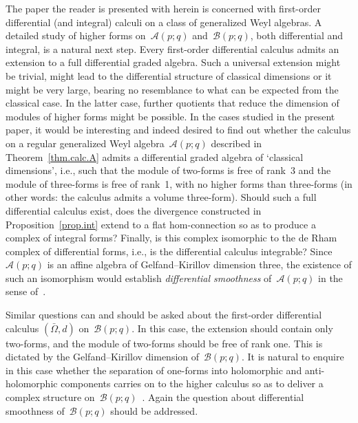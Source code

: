 \documentclass[10pt,a4paper]{amsart}
\numberwithin{equation}{section}
\def\Weyl#1#2{{\mathcal{B}}(#1;#2)}
\def\AWeyl#1#2{{\mathcal{A}}(#1;#2)}
\begin{document}
The paper the reader is presented with herein is concerned with f\/irst-order dif\/ferential (and integral) calculi on a class of generalized Weyl algebras. A detailed study of higher forms on~$\AWeyl p q$ and~$\Weyl p q$, both dif\/ferential and integral, is a natural next step. Every f\/irst-order dif\/ferential calculus admits an extension to a full dif\/ferential graded algebra. Such a universal extension might be trivial, might lead to the dif\/ferential structure of classical dimensions or it might be very large, bearing no resemblance to what can be expected from the classical case. In the latter case, further quotients that reduce the dimension of modules of higher forms might be possible. In the cases studied in the present paper, it would be interesting and indeed desired to f\/ind out whether the calculus on a regular generalized Weyl algebra~$\AWeyl p q$ described in Theorem~\ref{thm.calc.A} admits a dif\/ferential graded algebra of `classical dimensions', i.e., such that the module of two-forms is free of rank~3 and the module of three-forms is free of rank~1, with no higher forms than three-forms (in other words: the calculus admits a volume three-form). Should such a full dif\/ferential calculus exist, does the divergence constructed in Proposition~\ref{prop.int} extend to a f\/lat hom-connection so as to produce a complex of integral forms? Finally, is this complex isomorphic to the de Rham complex of dif\/ferential forms, i.e., is the dif\/ferential calculus integrable? Since~$\AWeyl p q$ is an af\/f\/ine algebra of Gelfand--Kirillov dimension three, the existence of such an isomorphism would establish {\em differential smoothness} of~$\AWeyl p q$ in the sense of~\cite{BrzSit:smo}.

Similar questions can and should be asked about the f\/irst-order dif\/ferential calculus $(\bar{\Omega}, d)$ on~$\Weyl p q$. In this case, the extension should contain only two-forms, and the module of two-forms should be free of rank one. This is dictated by the Gelfand--Kirillov dimension of~$\Weyl p q$. It is natural to enquire in this case whether the separation of one-forms into holomorphic and anti-holomorphic components carries on to the higher calculus so as to deliver a complex structure on~$\Weyl p q$~\cite{BegSmi:com,KhaLan:hol}. Again the question about dif\/ferential smoothness of~$\Weyl p q$ should be addressed.
\end{document}
